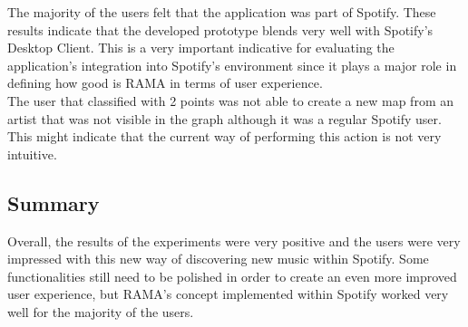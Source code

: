       The majority of the users felt that the application was part of Spotify.
      These results indicate that the developed prototype blends very well with Spotify's Desktop Client.
      This is a very important indicative for evaluating the application's integration into Spotify's environment since it plays a major role in defining how good is RAMA in terms of user experience. \\

      The user that classified with 2 points was not able to create a new map from an artist that was not visible in the graph although it was a regular Spotify user.
      This might indicate that the current way of performing this action is not very intuitive.
  

  \subsection{Summary}

    Overall, the results of the experiments were very positive and the users were very impressed with this new way of discovering new music within Spotify.
    Some functionalities still need to be polished in order to create an even more improved user experience, but RAMA's concept implemented within Spotify worked very well for the majority of the users.
  
